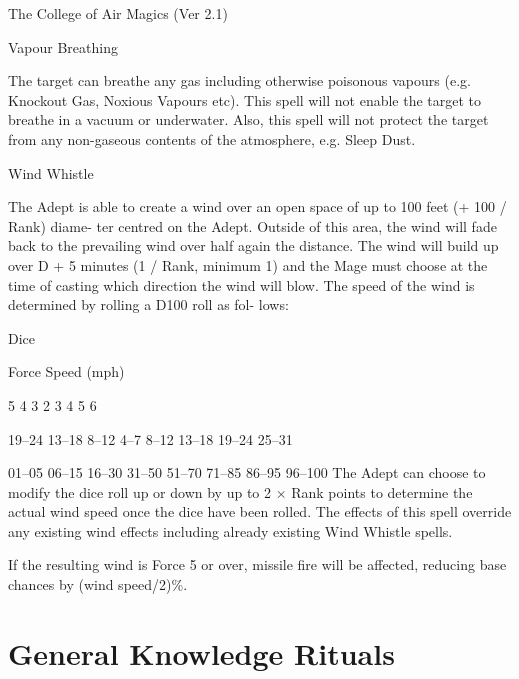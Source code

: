 \begin{Chapter}{The College of Air Magics (Ver 2.1)}
\begin{spell}[G-8]{Vapour Breathing }
\begin{effects}
 The  target  can  breathe  any  gas  including 
otherwise  poisonous  vapours  (e.g.  Knockout  Gas, 
Noxious  Vapours  etc).  This  spell  will  not  enable 
the  target  to  breathe  in  a  vacuum  or  underwater. 
Also, this spell will not protect the target from any 
non-gaseous contents of the atmosphere, e.g. Sleep 
Dust. 

\end{effects}
\end{spell}

\begin{spell}[G-9]{Wind Whistle }

\begin{effects}
The Adept is able to create a wind over an 
open space of up to 100 feet (+ 100 / Rank) diame-
ter  centred  on  the  Adept.  Outside  of  this  area,  the 
wind  will  fade  back  to  the  prevailing  wind  over 
half again the distance. The wind will build up over 
D  +  5  minutes  (1  /  Rank,  minimum  1)  and  the 
Mage  must  choose  at  the  time  of  casting  which 
direction  the  wind  will  blow.  The  speed  of  the 
wind  is  determined  by  rolling  a  D100  roll  as  fol-
lows: 

Dice 

Force  Speed (mph) 

5 
4 
3 
2 
3 
4 
5 
6 

19–24 
13–18 
8–12 
4–7 
8–12 
13–18 
19–24 
25–31 

01–05 
06–15 
16–30 
31–50 
51–70 
71–85 
86–95 
96–100 
The Adept can choose to modify the dice roll up or 
down  by  up  to  2  ×  Rank  points  to  determine  the 
actual  wind  speed  once  the  dice  have  been  rolled. 
The effects of this spell override any existing wind 
effects  including  already  existing  Wind  Whistle 
spells. 

If the resulting wind is Force 5 or over, missile fire 
will  be  affected,  reducing  base  chances  by  (wind 
speed/2)\%. 


\end{effects}
\end{spell}

\section{General Knowledge Rituals}


\end{Chapter}
